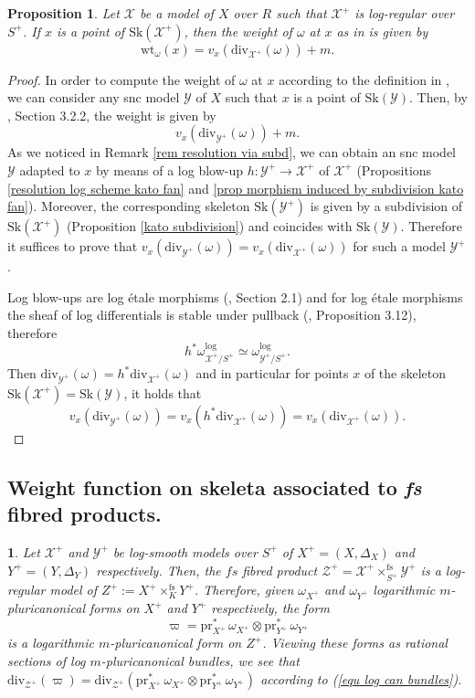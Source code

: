 \documentclass{amsart}%
\numberwithin{equation}{subsection}
\theoremstyle{plain2}
\newtheorem{prop}[equation]{Proposition}
\theoremstyle{definition2}
\theoremstyle{stepstyle}
\theoremstyle{point}
\theoremstyle{subpoint}
\newtheorem{subpoint}[equation]{}%
\newcommand{\spa}[1]{\begin{subpoint}#1\end{subpoint}}           %
\newcommand{\cX}{\ensuremath{\mathscr{X}}}
\newcommand{\cY}{\ensuremath{\mathscr{Y}}}
\newcommand{\cZ}{\ensuremath{\mathscr{Z}}}
\renewcommand{\cZ}{\ensuremath{\mathscr{Z}}}
\renewcommand{\cY}{\ensuremath{\mathscr{Y}}}
\newcommand{\pr}{\mathrm{pr}}
\newcommand{\divisor}{\mathrm{div}}
\newcommand{\weight}{\mathrm{wt}}
\newcommand{\Sk}{\mathrm{Sk}}
\begin{document}
\begin{prop} \label{prop weight function log formula}
Let $\cX$ be a model of $X$ over $R$ such that $\cX^+$ is log-regular over $S^+$. If $x$ is a point of $\Sk(\cX^+)$, then the weight of $\omega$ at $x$ as in \cite{MustataNicaise} is given by $$\weight_{\omega}(x)=v_x(\divisor_{\cX^+}(\omega)) +m.$$
\end{prop}
\begin{proof}
In order to compute the weight of $\omega$ at $x$ according to the definition in \cite{MustataNicaise}, we can consider any snc model $\cY$ of $X$ such that $x$ is a point of $\Sk(\cY)$. Then, by \cite{NicaiseXu}, Section 3.2.2, the weight is given by $$v_x(\divisor_{\cY^+}(\omega))+m.$$
As we noticed in Remark \ref{rem resolution via subd}, we can obtain an snc model $\cY$ adapted to $x$ by means of a log blow-up $h: \cY^+ \rightarrow \cX^+$ of $\cX^+$ (Propositions \ref{resolution log scheme kato fan} and \ref{prop morphism induced by subdivision kato fan}). Moreover, the corresponding skeleton $\Sk(\cY^+)$ is given by a subdivision of $\Sk(\cX^+)$ (Proposition \ref{kato subdivision}) and coincides with $\Sk(\cY)$. Therefore it suffices to prove that $v_x(\divisor_{\cY^+}(\omega)) =   v_x(\divisor_{\cX^+}(\omega))$ for such a model $\cY^+$.

Log blow-ups are log \'{e}tale morphisms (\cite{Saito2004}, Section 2.1) and for log \'{e}tale morphisms the sheaf of log differentials is stable under pullback (\cite{Kato1994a}, Proposition 3.12), therefore $$h^* \omega_{\cX^+/ S^+}^{\text{log}} \simeq \omega_{\cY^+/S^+}^{\text{log}}.$$ Then $\divisor_{\cY^+}(\omega)=h^* \divisor_{\cX^+}(\omega)$ and in particular for points $x$ of the skeleton $\Sk(\cX^+) = \Sk(\cY)$, it holds that $$v_{x}(\divisor_{\cY^+}(\omega))= v_{x}(h^*\divisor_{\cX^+}(\omega))= v_x(\divisor_{\cX^+}(\omega)).$$
\end{proof}

\subsection{Weight function on skeleta associated to \textit{fs} fibred products.} \label{paragraph weight function product}
\spa{Let $\cX^+$ and $\cY^+$ be log-smooth models over $S^+$ of $X^+=(X,\Delta_X)$ and $Y^+=(Y,\Delta_Y)$ respectively. Then, the $fs$ fibred product $\cZ^+=\cX^+  \times^{\text{fs}}_{S^+} \cY^+$ is a log-regular model of $Z^+:=X^+ \times^{\text{fs}}_K Y^+$. Therefore, given $\omega_{X^+}$ and $\omega_{Y^+}$ logarithmic $m$-pluricanonical forms on $X^+$ and $Y^+$ respectively, the form $$\varpi=\pr_{X^+}^* \,\omega_{X^+} \otimes \pr_{Y^+}^* \,\omega_{Y^+}$$ is a logarithmic $m$-pluricanonical form on $Z^+$. Viewing these forms as rational sections of log $m$-pluricanonical bundles, we see that $\divisor_{\cZ^+}(\varpi)=\divisor_{\cZ^+}( \pr_{X^+}^* \,\omega_{X^+} \otimes \pr_{Y^+}^* \,\omega_{Y^+})$ according to (\ref{equ log can bundles}).}
\end{document}

